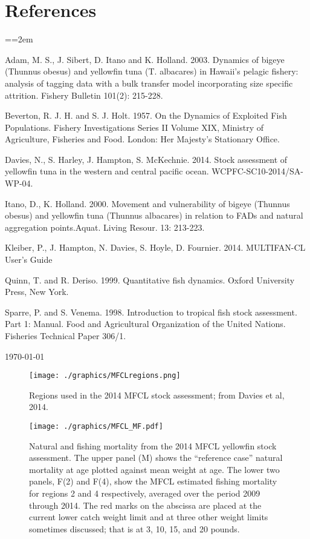 \documentclass[12pt,letterpaper]{article}
\begin{document}
\section*{References}
{\parindent=0cm \small
\everypar={\hangindent=2em }\par
Adam, M. S., J. Sibert, D. Itano and K. Holland. 2003. Dynamics of
bigeye (Thunnus obesus) and yellowfin tuna (T. albacares) in Hawaii's
pelagic fishery: analysis of tagging data with a bulk transfer model
incorporating size specific attrition. Fishery Bulletin 101(2):
215-228.

Beverton, R. J. H. and S. J. Holt. 1957. On the Dynamics of Exploited
Fish Populations. Fishery Investigations Series II Volume XIX,
Ministry of Agriculture, Fisheries and Food. London: Her Majesty's
Stationary Office.

Davies, N., S. Harley, J. Hampton, S. McKechnie. 2014. Stock
assessment of yellowfin tuna in the western and central pacific ocean.
WCPFC-SC10-2014/SA-WP-04.

Itano, D., K. Holland. 2000.  Movement and vulnerability of bigeye
(Thunnus obesus) and yellowfin tuna (Thunnus albacares) in relation to
FADs and natural aggregation points.Aquat. Living Resour. 13: 213-223.

Kleiber, P., J. Hampton, N. Davies, S. Hoyle, D. Fournier. 2014.
MULTIFAN-CL User’s Guide

Quinn, T. and R. Deriso. 1999. Quantitative fish dynamics. Oxford
University Press, New York.

Sparre, P. and S. Venema. 1998. Introduction to tropical fish stock
assessment. Part 1: Manual. Food and Agricultural Organization of the
United Nations. Fisheries Technical Paper 306/1.
\par}
\vfill
\today
\clearpage

\begin{figure}
\begin{center}
\texttt{[image: ./graphics/MFCLregions.png]}
\caption{\label{fig:mfclreg}
Regions used in the 2014 MFCL stock assessment; from Davies et al,
2014.
}
\end{center}
\end{figure}

\begin{figure}
\begin{center}
\texttt{[image: ./graphics/MFCL\_MF.pdf]}
\caption{\label{fig:mfclmf}
Natural and fishing mortality from the 2014 MFCL yellowfin stock
assessment. The upper panel (M) shows the ``reference case'' natural
mortality at age plotted against mean weight at age.
The lower two panels, F(2) and F(4), show the MFCL estimated fishing
mortality for regions 2 and 4 respectively, averaged over the period
2009 through 2014.
The red marks on the abscissa are placed at
the current lower catch weight limit and at three other
weight limits sometimes discussed; 
that is at 3, 10, 15, and 20 pounds.
}
\end{center}
\end{figure}
\end{document}
